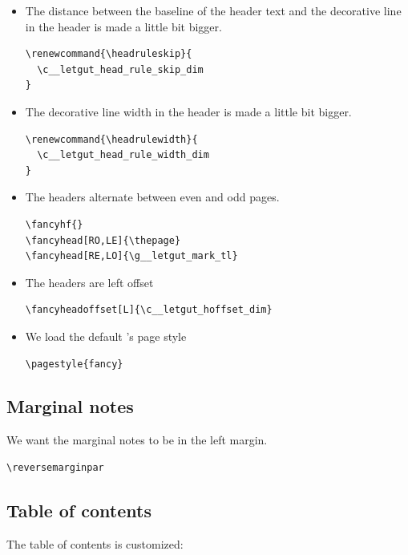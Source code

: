 \documentclass{letgut}
\begin{document}
\begin{itemize}
\item The distance between the baseline of the header text and the decorative line
in the header is made a little bit bigger.
\begin{lstlisting}
\renewcommand{\headruleskip}{
  \c__letgut_head_rule_skip_dim
}
\end{lstlisting}
\item The decorative line width in the header is made a little bit bigger.
\begin{lstlisting}
\renewcommand{\headrulewidth}{
  \c__letgut_head_rule_width_dim
}
\end{lstlisting}
\item The headers alternate between even and odd pages.
\begin{lstlisting}
\fancyhf{}
\fancyhead[RO,LE]{\thepage}
\fancyhead[RE,LO]{\g__letgut_mark_tl}
\end{lstlisting}
\item The headers are left offset
\begin{lstlisting}
\fancyheadoffset[L]{\c__letgut_hoffset_dim}
\end{lstlisting}
\item We load the default 's page style
\begin{lstlisting}
\pagestyle{fancy}
\end{lstlisting}
\end{itemize}

\subsection{Marginal notes}
\label{sec:org56c8ec1}
We want the marginal notes to be in the left margin.

\begin{lstlisting}
\reversemarginpar
\end{lstlisting}

\subsection{Table of contents}
\label{sec:org861e968}

The table of contents is customized:
\end{document}
